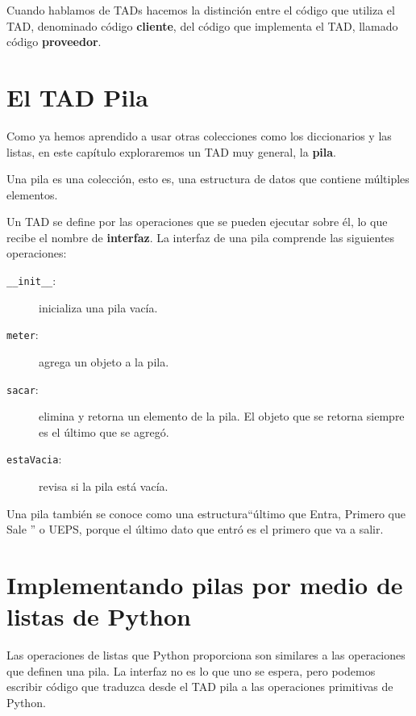 Cuando hablamos de TADs hacemos la distinción entre el código que
utiliza el  TAD, denominado código {\bf cliente}, del código que
implementa el TAD, llamado código {\bf proveedor}.



\section{El TAD Pila}

Como ya hemos aprendido a usar otras 
colecciones como los diccionarios y las listas, en este capítulo exploraremos un TAD muy general, la {\bf pila}. 

Una pila es una colección, esto es, una estructura de datos que 
contiene múltiples elementos. 

Un TAD se define por las operaciones que se pueden ejecutar sobre él, 
lo que recibe el nombre de {\bf interfaz}.  La interfaz de una pila
comprende las siguientes operaciones:

\begin{description}

\item[\texttt{\_\_init\_\_}:] inicializa una pila vacía.

\item[\texttt{meter}:] agrega un objeto a la pila.

\item[\texttt{sacar}:] elimina y retorna un elemento de la pila.  El 
objeto que se retorna siempre es el último que se agregó.

\item[\texttt{estaVacia}:] revisa si la pila está vacía.

\end{description}

Una pila también se conoce como una estructura``último que Entra, Primero que Sale '' 
o UEPS, porque el último dato que entró es el primero que va a salir.


\section {Implementando pilas por medio de listas de Python}

Las operaciones de listas que Python proporciona son similares a 
las operaciones que definen una pila. La interfaz no es lo que
uno se espera, pero podemos escribir código que traduzca desde
el TAD pila a las operaciones primitivas de Python.


